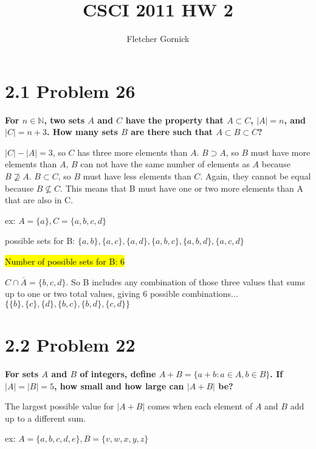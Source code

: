 \documentclass[10pt]{article}
\title{CSCI 2011 HW 2}
\author{Fletcher Gornick}
\def \n {\par \vspace{\baselineskip}}
\begin{document}
\maketitle

\section{2.1 Problem 26}
\textbf{For $n \in \mathbb{N}$, two sets $A$ and $C$ have the property that $A \subset C$, 
$|A| = n$, and $|C| = n+3$. How many sets $B$ are there such that $A \subset B \subset C$?}

\n

$|C|-|A| = 3$, so $C$ has three more elements than $A$. $B \supset A$, so $B$ must have
more elements than $A$, $B$ can not have the same number of elements as $A$ because 
$B \not\supseteq A$. $B \subset C$, so $B$ must have less elements than $C$. Again, they
cannot be equal because $B \not\subseteq C$.  This means that B must have one or two more
elements than A that are also in C.

\n

ex: $A = \{a\}, C = \{a,b,c,d\}$

possible sets for B: $\{a,b\}, \{a,c\}, \{a,d\}, \{a,b,c\}, \{a,b,d\}, \{a,c,d\}$

\hl{Number of possible sets for B: 6}

\n

$C \cap \bar A = \{b,c,d\}$. So B includes any combination of those three values that 
sums up to one or two total values, giving 6 possible combinations...
$\big\{\{b\},\{c\},\{d\},\{b,c\},\{b,d\},\{c,d\}\big\}$



\section{2.2 Problem 22}
\textbf{For sets $A$ and $B$ of integers, define $A+B = \{a+b : a \in A, b \in B\}$.
If $|A| = |B| = 5$, how small and how large can $|A + B|$ be?}

\par \vspace{\baselineskip}

The largest possible value for $|A+B|$ comes when each element of $A$ and $B$ add up 
to a different sum.

\par \vspace{\baselineskip}

ex: $A = \{a,b,c,d,e\}, B = \{v,w,x,y,z\}$
\end{document}
